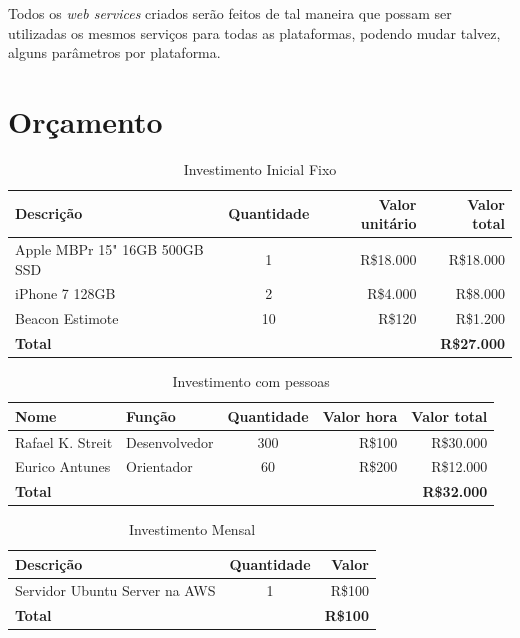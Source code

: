 \documentclass[
	12pt,
	oneside,
	a4paper,
	english,
	brazil,
]{abntex2}
\begin{document}
Todos os \emph{web services} criados serão feitos de tal maneira que possam ser utilizadas os mesmos serviços para todas as plataformas, podendo mudar talvez, alguns parâmetros por plataforma.



\chapter{Orçamento}

\noindent
\begin{table}[ht]
    \caption{Investimento Inicial Fixo}
    
    \begin{tabularx}{\textwidth}{X|c|r|r}
    \hline
        \textbf{Descrição} &
        \textbf{Quantidade} & 
        \textbf{Valor unitário} & 
        \textbf{Valor total} \\
    \hline
        Apple MBPr 15" 16GB 500GB SSD&1&R\$18.000&R\$18.000 \\
        iPhone 7 128GB&2&R\$4.000&R\$8.000 \\
        Beacon Estimote&10&R\$120&R\$1.200 \\ [1ex]
    \hline
        \textbf{Total}&&&\textbf{R\$27.000} \\ [1ex]
    \end{tabularx}
\end{table}

\noindent
\begin{table}[ht]
    \caption{Investimento com pessoas}

    \begin{tabularx}{\textwidth}{X|l|c|r|r}
    \hline
        \textbf{Nome} & 
        \textbf{Função} & 
        \textbf{Quantidade} & 
        \textbf{Valor hora} &
        \textbf{Valor total} \\
    \hline
        Rafael K. Streit&Desenvolvedor &300&R\$100&R\$30.000\\
        Eurico Antunes&Orientador&60&R\$200&R\$12.000 \\
    \hline
        \textbf{Total} &&&& \textbf{R\$32.000} \\
    \end{tabularx}
\end{table}

\noindent
\begin{table}[ht]
    \caption{Investimento Mensal}
    \begin{tabularx}{\textwidth}{X|c|r}
    \hline
        \textbf{Descrição} &
        \textbf{Quantidade} &
        \textbf{Valor} \\
    \hline
        Servidor Ubuntu Server na AWS &1 &R\$100 \\
    \hline
        \textbf{Total}&&\textbf{R\$100} \\ [1ex]
    \end{tabularx}
\end{table}
\end{document}
